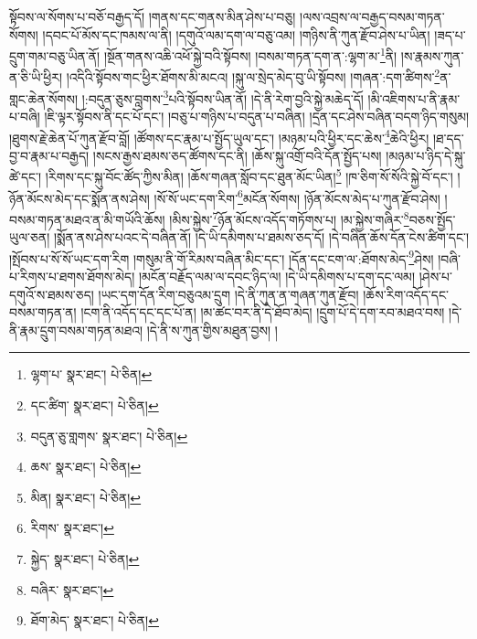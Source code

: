 སྟོབས་ལ་སོགས་པ་བཅོ་བརྒྱད་དོ། །གནས་དང་གནས་མིན་ཤེས་པ་བཅུ། །ལས་འབྲས་ལ་བརྒྱད་བསམ་གཏན་སོགས། །དབང་པོ་མོས་དང་ཁམས་ལ་ནི། །དགུའོ་ལམ་དག་ལ་བཅུ་འམ། །གཉིས་ནི་ཀུན་རྫོབ་ཤེས་པ་ཡིན། །ཟད་པ་དྲུག་གམ་བཅུ་ཡིན་ནོ། །སྔོན་གནས་འཆི་འཕོ་སྐྱེ་བའི་སྟོབས། །བསམ་གཏན་དག་ན་:ལྷག་མ་\footnote{ལྷག་པ་  སྣར་ཐང་།  པེ་ཅིན། }ནི། །ས་རྣམས་ཀུན་ན་ཅི་ཡི་ཕྱིར། །འདིའི་སྟོབས་གང་ཕྱིར་ཐོགས་མི་མངའ། །སྐུ་ལ་སྲེད་མེད་བུ་ཡི་སྟོབས། །གཞན་:དག་ཚིགས་\footnote{དང་ཚིག་  སྣར་ཐང་།  པེ་ཅིན། }ན་གླང་ཆེན་སོགས། །:བདུན་ཅུས་བླགས་\footnote{བདུན་ཅུ་གླགས་  སྣར་ཐང་།  པེ་ཅིན། }པའི་སྟོབས་ཡིན་ནོ། །དེ་ནི་རེག་བྱའི་སྐྱེ་མཆེད་དོ། །མི་འཇིགས་པ་ནི་རྣམ་པ་བཞི། །ཇི་ལྟར་སྟོབས་ནི་དང་པོ་དང་། །བཅུ་པ་གཉིས་པ་བདུན་པ་བཞིན། །དྲན་དང་ཤེས་བཞིན་བདག་ཉིད་གསུམ། །ཐུགས་རྗེ་ཆེན་པོ་ཀུན་རྫོབ་བློ། །ཚོགས་དང་རྣམ་པ་སྤྱོད་ཡུལ་དང་། །མཉམ་པའི་ཕྱིར་དང་ཆེས་\footnote{ཆས་  སྣར་ཐང་།  པེ་ཅིན། }ཆེའི་ཕྱིར། །ཐ་དད་བྱ་བ་རྣམ་པ་བརྒྱད། །སངས་རྒྱས་ཐམས་ཅད་ཚོགས་དང་ནི། །ཆོས་སྐུ་འགྲོ་བའི་དོན་སྤྱོད་པས། །མཉམ་པ་ཉིད་དེ་སྐུ་ཚེ་དང་། །རིགས་དང་སྐུ་བོང་ཚོད་ཀྱིས་མིན། །ཆོས་གཞན་སློབ་དང་ཐུན་མོང་ཡིན།\footnote{མིན།  སྣར་ཐང་།  པེ་ཅིན། } །ཁ་ཅིག་སོ་སོའི་སྐྱེ་བོ་དང་། །ཉོན་མོངས་མེད་དང་སྨོན་ནས་ཤེས། །སོ་སོ་ཡང་དག་རིག་\footnote{རིགས་  སྣར་ཐང་། }མངོན་སོགས། །ཉོན་མོངས་མེད་པ་ཀུན་རྫོབ་ཤེས། །བསམ་གཏན་མཐའ་ན་མི་གཡོའི་ཆོས། །མིས་སྐྱེས་\footnote{སྐྱེད་  སྣར་ཐང་།  པེ་ཅིན། }ཉོན་མོངས་འདོད་གཏོགས་པ། །མ་སྐྱེས་གཞིར་\footnote{བཞིར་  སྣར་ཐང་། }བཅས་སྤྱོད་ཡུལ་ཅན། །སྨོན་ནས་ཤེས་པའང་དེ་བཞིན་ནོ། །དེ་ཡི་དམིགས་པ་ཐམས་ཅད་དོ། །དེ་བཞིན་ཆོས་དོན་ངེས་ཚིག་དང་། །སྤོབས་པ་སོ་སོ་ཡང་དག་རིག །གསུམ་ནི་གོ་རིམས་བཞིན་མིང་དང་། །དོན་དང་ངག་ལ་:ཐོགས་མེད་\footnote{ཐོག་མེད་  སྣར་ཐང་།  པེ་ཅིན། }ཤེས། །བཞི་པ་རིགས་པ་ཐགས་ཐོགས་མེད། །མངོན་བརྗོད་ལམ་ལ་དབང་ཉིད་ལ། །དེ་ཡི་དམིགས་པ་དག་དང་ལམ། །ཤེས་པ་དགུའོ་ས་ཐམས་ཅད། །ཡང་དག་དོན་རིག་བཅུའམ་དྲུག །དེ་ནི་ཀུན་ན་གཞན་ཀུན་རྫོབ། །ཆོས་རིག་འདོད་དང་བསམ་གཏན་ན། །ངག་ནི་འདོད་དང་དང་པོ་ན། །མ་ཚང་བར་ནི་དེ་ཐོབ་མེད། །དྲུག་པོ་དེ་དག་རབ་མཐའ་བས། །དེ་ནི་རྣམ་དྲུག་བསམ་གཏན་མཐའ། །དེ་ནི་ས་ཀུན་གྱིས་མཐུན་བྱས། །
